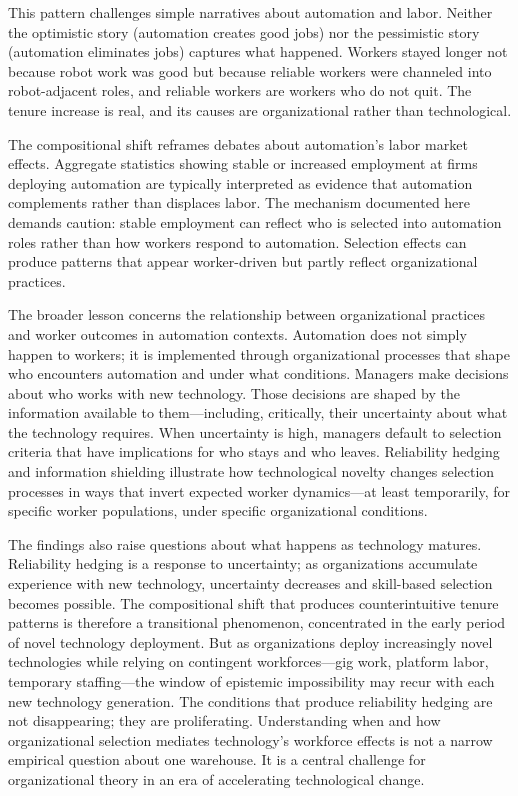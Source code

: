 \documentclass[12pt]{article}
\begin{document}
This pattern challenges simple narratives about automation and labor. Neither the optimistic story (automation creates good jobs) nor the pessimistic story (automation eliminates jobs) captures what happened. Workers stayed longer not because robot work was good but because reliable workers were channeled into robot-adjacent roles, and reliable workers are workers who do not quit. The tenure increase is real, and its causes are organizational rather than technological.

The compositional shift reframes debates about automation's labor market effects. Aggregate statistics showing stable or increased employment at firms deploying automation are typically interpreted as evidence that automation complements rather than displaces labor. The mechanism documented here demands caution: stable employment can reflect who is selected into automation roles rather than how workers respond to automation. Selection effects can produce patterns that appear worker-driven but partly reflect organizational practices.

The broader lesson concerns the relationship between organizational practices and worker outcomes in automation contexts. Automation does not simply happen to workers; it is implemented through organizational processes that shape who encounters automation and under what conditions. Managers make decisions about who works with new technology. Those decisions are shaped by the information available to them---including, critically, their uncertainty about what the technology requires. When uncertainty is high, managers default to selection criteria that have implications for who stays and who leaves. Reliability hedging and information shielding illustrate how technological novelty changes selection processes in ways that invert expected worker dynamics---at least temporarily, for specific worker populations, under specific organizational conditions.

The findings also raise questions about what happens as technology matures. Reliability hedging is a response to uncertainty; as organizations accumulate experience with new technology, uncertainty decreases and skill-based selection becomes possible. The compositional shift that produces counterintuitive tenure patterns is therefore a transitional phenomenon, concentrated in the early period of novel technology deployment. But as organizations deploy increasingly novel technologies while relying on contingent workforces---gig work, platform labor, temporary staffing---the window of epistemic impossibility may recur with each new technology generation. The conditions that produce reliability hedging are not disappearing; they are proliferating. Understanding when and how organizational selection mediates technology's workforce effects is not a narrow empirical question about one warehouse. It is a central challenge for organizational theory in an era of accelerating technological change.



\end{document}
